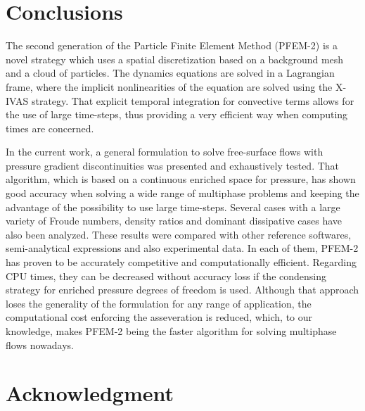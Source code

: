 \documentclass[review]{elsarticle}
\begin{document}





% 


\section{Conclusions}

The second generation of the Particle Finite Element Method (PFEM-2) is a novel strategy which uses a spatial discretization based on a background mesh and a cloud of particles. The dynamics equations are solved in a Lagrangian frame, where the implicit nonlinearities of the equation are solved using the {X-IVAS} strategy. That explicit temporal integration for convective terms allows for the use of large time-steps, thus providing a very efficient way when computing times are concerned.

In the current work, a general formulation to solve free-surface flows with pressure gradient discontinuities was presented and exhaustively tested. That algorithm, which is based on a continuous enriched space for pressure, has shown good accuracy when solving a wide range of multiphase problems and keeping the advantage of the possibility to use large time-steps. Several cases with a large variety of Froude numbers, density ratios and dominant dissipative cases have also been analyzed. These results were compared with other reference softwares, semi-analytical expressions and also experimental data. In each of them, PFEM-2 has proven to be accurately competitive and computationally efficient. Regarding CPU times, they can be decreased without accuracy loss if the condensing strategy for enriched pressure degrees of freedom is used. Although that approach loses the generality of the formulation for any range of application, the computational cost enforcing the asseveration is reduced, which, to our knowledge, makes PFEM-2 \textcolor[rgb]{1.00,0.00,0.00}{being} the faster algorithm for solving multiphase flows nowadays.

\section*{Acknowledgment}
\end{document}
